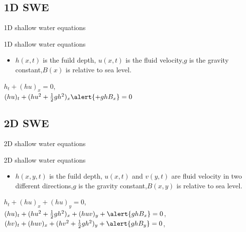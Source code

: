\documentclass{beamer}
\begin{document}
\subsection{1D SWE}
\begin{frame}{1D shallow water equations}

    \begin{block}{1D shallow water equations}
      \begin{itemize}
        \item $h(x,t)$ is the fuild depth, $u(x,t)$ is the fluid velocity,$g$ is the gravity constant,$B(x)$ is relative to sea level.
        
      \end{itemize}
      \begin{center}
      	$h_{t} + (hu)_{x} = 0$,\\
	    $(hu)_{t} + (hu^{2} + \frac{1}{2}gh^{2})_{x} \alert{+ ghB_{x}} =0$
	  \end{center}
    \end{block}
  
 
\end{frame}
\subsection{2D SWE}
\begin{frame}{2D shallow water equations}

	\begin{block}{2D shallow water equations}
      \begin{itemize}
        \item $h(x,y,t)$ is the fuild depth, $u(x,t)$ and $v(y,t)$ are fluid velocity in two different directions,$g$ is the gravity constant,$B(x,y)$ is relative to sea level.
        
      \end{itemize}
      \begin{center}
      	$h_{t} + (hu)_{x} + (hu)_{y} = 0$,\\
$(hu)_{t} + (hu^{2} + \frac{1}{2}gh^{2})_{x}+(huv)_{y} + \alert{ghB_{x}} =0$,\\
$(hv)_{t} +(huv)_{x} + (hv^{2} + \frac{1}{2}gh^{2})_{y}+ \alert{ghB_{y}}=0$,\\
	  \end{center}
    \end{block}

\end{frame}
\end{document}
